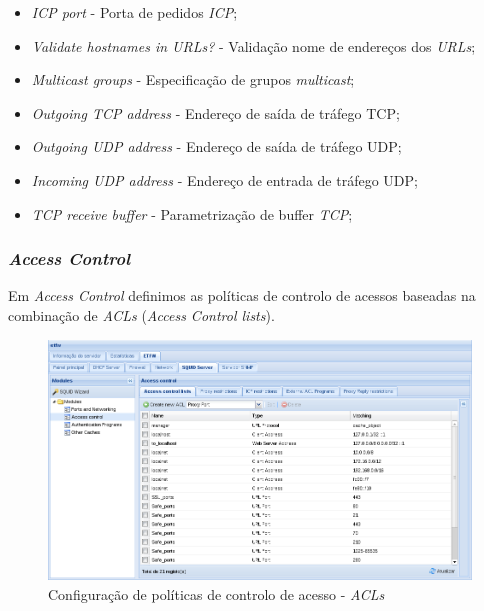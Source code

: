 \begin{itemize}
    \item \textit{ICP port} - Porta de pedidos \textit{ICP};
    \item \textit{Validate hostnames in URLs?} - Validação nome de endereços dos \textit{URLs};
    \item \textit{Multicast groups} - Especificação de grupos \textit{multicast};
    \item \textit{Outgoing TCP address} - Endereço de saída de tráfego TCP;
    \item \textit{Outgoing UDP address} - Endereço de saída de tráfego UDP;
    \item \textit{Incoming UDP address} - Endereço de entrada de tráfego UDP;
    \item \textit{TCP receive buffer} - Parametrização de buffer \textit{TCP};
\end{itemize}

\subsubsection{\textit{Access Control}}

Em \textit{Access Control} definimos as políticas de controlo de acessos baseadas na combinação de \textit{ACLs} (\textit{Access Control lists}).

\begin{figure}[H]
    \begin{center}
    \includegraphics[scale=0.38]{screenshots/etfw/etfw_squid_accesscontrol_01.png}
    \caption{Configuração de políticas de controlo de acesso - \textit{ACLs}}
    \label{fig:etfw_squid_accesscontrol_01}
    \end{center}
\end{figure}

